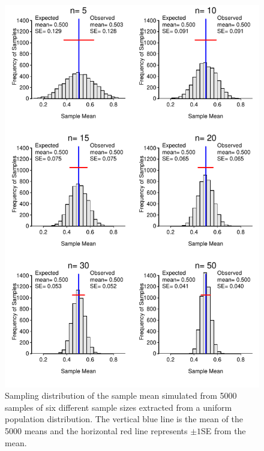 \documentclass[10pt,openany]{book}\usepackage[]{graphicx}\usepackage[]{color}
\newenvironment{knitrout}{}{} %
\begin{document}
\begin{knitrout}
\color{fgcolor}\begin{figure}[hbtp]

{\centering \includegraphics[width=.8\linewidth]{Figs/SampDistUnifMeann-1} 

}

\caption[Sampling distribution of sample means from uniform distribution]{Sampling distribution of the sample mean simulated from 5000 samples of six different sample sizes extracted from a uniform population distribution.  The vertical blue line is the mean of the 5000 means and the horizontal red line represents $\pm1$SE from the mean.}\label{fig:SampDistUnifMeann}
\end{figure}


\end{knitrout}
\end{document}

